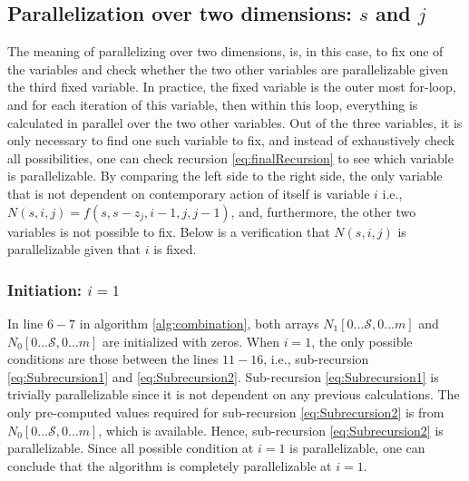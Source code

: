 \documentclass[a4paper]{article}
\begin{document}
\subsection{Parallelization over two dimensions: $s$ and $j$}
\label{sec:2Dpara}
The meaning of parallelizing over two dimensions, is, in this case, to fix one of the variables and check whether the two other variables are parallelizable given the third fixed variable. In practice, the fixed variable is the outer most for-loop, and for each iteration of this variable, then within this loop, everything is calculated in parallel over the two other variables.
Out of the three variables, it is only necessary to find one such variable to fix, and instead of exhaustively check all possibilities, one can check recursion \ref{eq:finalRecursion} to see which variable is parallelizable. By comparing the left side to the right side, the only variable that is not dependent on contemporary action of itself is variable $i$ i.e., $N(s,i,j)=f(s,s-z_{j},i-1,j,j-1)$, and, furthermore, the other two variables is not possible to fix. Below is a verification that $N(s,i,j)$ is parallelizable given that $i$ is fixed.
\newline

\subsubsection{Initiation: $i=1$}
\label{subsubsec:v2}
In line $6-7$ in algorithm \ref{alg:combination}, both arrays $N_{1}[0...\mathcal{S},0...m]$ and $N_{0}[0...\mathcal{S},0...m]$ are initialized with zeros. When $i=1$, the only possible conditions are those between the lines $11-16$, i.e., sub-recursion \ref{eq:Subrecursion1} and \ref{eq:Subrecursion2}. Sub-recursion \ref{eq:Subrecursion1} is trivially parallelizable since it is not dependent on any previous calculations. The only pre-computed values required for sub-recursion \ref{eq:Subrecursion2} is from $N_{0}[0...\mathcal{S},0...m]$, which is available. Hence, sub-recursion \ref{eq:Subrecursion2} is parallelizable. Since all possible condition at $i=1$ is parallelizable, one can conclude that the algorithm is completely parallelizable at $i=1$.
\end{document}
